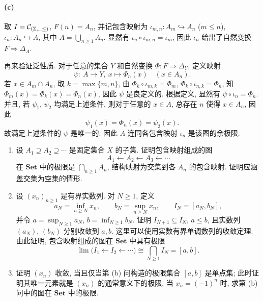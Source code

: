 \documentclass{article}
\begin{document}
\begin{solution}
	\paragraph{(c)} 取 $I = \mathcal C_{(\mathbb{Z}_+,\le)}$, $F(n) = A_n$, 并记包含映射为 $\iota_{m,n}: A_m \hookrightarrow A_n$ ($m\le n$), $\iota_n: A_n \hookrightarrow A$, 其中 $A = \bigcup_{n\ge1}A_n$. 显然有 $\iota_n \circ \iota_{m,n} = \iota_m$, 因此 $\iota_n$ 给出了自然变换 $F \Rightarrow \Delta_A$.

	再来验证泛性质. 对于任意的集合 $Y$ 和自然变换 $\Phi: F \Rightarrow \Delta_Y$, 定义映射
	\[ \psi: \ A \to Y,\ x \mapsto \Phi_n(x) \quad (x\in A_n). \]
	若 $x \in A_m \cap A_n$, 取 $k = \max\{m,n\}$, 由 $\Phi_k \circ \iota_{m,k} = \Phi_m$, $\Phi_k \circ \iota_{n,k} = \Phi_n$, 知 $\Phi_m(x) = \Phi_k(x) = \Phi_n(x)$, 因此 $\psi$ 是良定义的. 根据定义, 显然有 $\psi \circ \iota_n = \Phi_n$. 并且, 若 $\psi_1$, $\psi_2$ 均满足上述条件, 则对于任意的 $x\in A$, 总存在 $n$ 使得 $x\in A_n$, 因此
	\[ \psi_1(x) = \Phi_n(x) = \psi_2(x). \]
	故满足上述条件的 $\psi$ 是唯一的. 因此 $A$ 连同各包含映射 $\iota_n$ 是该图的余极限.
\end{solution}



\begin{problem}
\begin{enumerate}
  \item[(a)] 设 $A_1\supseteq A_2\supseteq\cdots$ 是固定集合 $X$ 的子集. 证明包含映射组成的图
  \[
    A_1\longleftarrow A_2\longleftarrow A_3\longleftarrow\cdots
  \]
  在 $\mathbf{Set}$ 中的极限是 $\bigcap_{n\ge1}A_n$, 结构映射为交集到各 $A_n$ 的包含映射. 证明应涵盖交集为空集的情形.
  \item[(b)] 设 $(x_n)_{n\ge1}$ 是有界实数列. 对 $N\ge1$, 定义
  \[
    a_N=\inf_{n\ge N}x_n,\qquad b_N=\sup_{n\ge N}x_n,\qquad I_N=[a_N,b_N],
  \]
  并令 $a=\sup_{N\ge1}a_N$, $b=\inf_{N\ge1}b_N$. 证明 $I_{N+1}\subseteq I_N$, $a\le b$, 且实数列 $(a_N)$, $(b_N)$ 分别收敛到 $a,b$. 这里可以使用实数有界单调数列的收敛定理. 由此证明, 包含映射组成的图在 $\mathbf{Set}$ 中具有极限
  \[
    \lim\bigl(I_1\longleftarrow I_2\longleftarrow\cdots\bigr)\cong\bigcap_{N\ge1}I_N=[a,b].
  \]
  \item[(c)] 证明 $(x_n)$ 收敛, 当且仅当第 (b) 问构造的极限集合 $[a,b]$ 是单点集; 此时证明其唯一元素就是 $(x_n)$ 的通常意义下的极限. 当 $x_n=(-1)^n$ 时, 求第 (b) 问中的图在 $\mathbf{Set}$ 中的极限.
\end{enumerate}
\end{problem}
\end{document}
